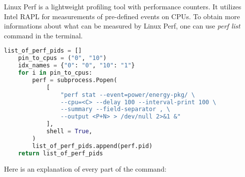 Linux Perf is a lightweight profiling tool with performance counters.
It utilizes Intel RAPL for measurements of pre-defined events on CPUs.
To obtain more informations about what can be measured by Linux Perf,
one can use \emph{perf list} command in the terminal.

\begin{lstlisting}[language=Python]
    list_of_perf_pids = []
    pin_to_cpus = ("0", "10")
    idx_names = {"0": "0", "10": "1"}
    for i in pin_to_cpus:
        perf = subprocess.Popen(
            [
                "perf stat --event=power/energy-pkg/ \
                --cpu=<C> --delay 100 --interval-print 100 \
                --summary --field-separator , \
                --output <P+N> > /dev/null 2>&1 &"
            ],
            shell = True,
        )
        list_of_perf_pids.append(perf.pid)
    return list_of_perf_pids
\end{lstlisting}

Here is an explanation of every part of the command:

